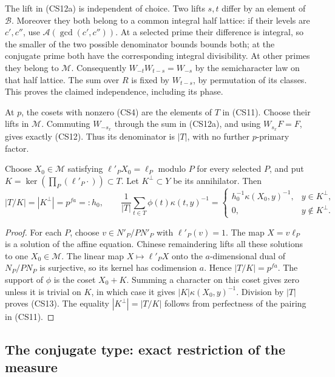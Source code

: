The lift in (CS12a) is independent of choice.  Two lifts
$s,t$ differ by an element of $\mathcal B$.  Moreover they
both belong to a common integral half lattice: if their
levels are $c',c''$, use $\mathcal A(\gcd(c',c''))$.
At a selected prime their difference is integral, so the
smaller of the two possible denominator bounds bounds
both; at the conjugate prime both have the corresponding
integral divisibility.  At other primes they belong to
$\mathcal M$.  Consequently $W_{-t}W_{t-s}=W_{-s}$
by the semicharacter law on that half lattice.  The sum
over $R$ is fixed by $W_{t-s}$, by permutation of its
classes.  This proves the claimed independence, including
its phase.

At $p$, the cosets with nonzero (CS4) are the elements
of $T$ in (CS11).  Choose their lifts in $\mathcal M$.
Commuting $W_{-s_x}$ through the sum in (CS12a), and using
$W_{s_x}F=F$, gives exactly (CS12).  Thus its denominator
is $|T|$, with no further $p$-primary factor.

\begin{lemma}\label{csp-fourier-fiber}
Choose $X_0\in\mathcal M$ satisfying
$\ell'_PX_0=\ell_P$ modulo $P$ for every selected $P$,
and put $K=\ker(\prod_P(\ell'_P\cdot))\subset T$.
Let $K^\perp\subset Y$ be its annihilator.  Then
\[
 |T/K|=|K^\perp|=p^{fa}=:h_0,
 \qquad
 \frac1{|T|}\sum_{t\in T}\phi(t)\kappa(t,y)^{-1}
       =\begin{cases}
          h_0^{-1}\kappa(X_0,y)^{-1},&y\in K^\perp,\\
          0,&y\notin K^\perp.
        \end{cases}                                       \tag{CS13}
\]
\end{lemma}
\begin{proof}
For each $P$, choose $v\in N'_P/PN'_P$ with
$\ell'_P(v)=1$.  The map $X=v\ell_P$ is a solution of
the affine equation.  Chinese remaindering lifts all these
solutions to one $X_0\in\mathcal M$.
The linear map $X\mapsto\ell'_PX$ onto the $a$-dimensional
dual of $N_P/PN_P$ is surjective, so its kernel has
codimension $a$.  Hence $|T/K|=p^{fa}$.
The support of $\phi$ is the coset $X_0+K$.
Summing a character on this coset gives zero unless it is
trivial on $K$, in which case it gives
$|K|\kappa(X_0,y)^{-1}$.  Division by $|T|$ proves (CS13).
The equality $|K^\perp|=|T/K|$ follows from perfectness
of the pairing in (CS11).
\end{proof}

\subsection{The conjugate type: exact restriction of the measure}

